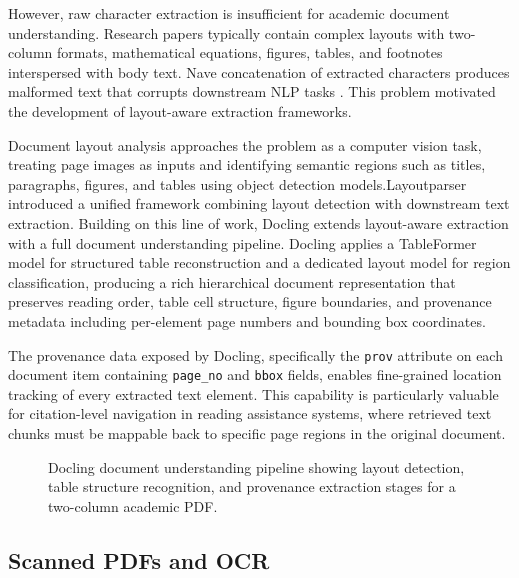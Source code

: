 \documentclass[12pt,a4paper]{report}
\begin{document}
However, raw character extraction is insufficient for academic 
document understanding. Research papers typically contain complex 
layouts with two-column formats, mathematical equations, figures, 
tables, and footnotes interspersed with body text. Nave 
concatenation of extracted characters produces malformed text 
that corrupts downstream NLP tasks \cite{vila2021}. This problem 
motivated the development of layout-aware extraction frameworks.

Document layout analysis approaches the problem as a computer 
vision task, treating page images as inputs and identifying 
semantic regions such as titles, paragraphs, figures, and tables 
using object detection models.Layoutparser \cite{shen2021} 
introduced a unified framework combining layout detection with 
downstream text extraction. Building on this line of work, 
Docling \cite{docling2024} extends layout-aware extraction with 
a full document understanding pipeline. Docling applies a 
TableFormer model \cite{nassar2022} for structured table 
reconstruction and a dedicated layout model for region 
classification, producing a rich hierarchical document 
representation that preserves reading order, table cell 
structure, figure boundaries, and provenance metadata including 
per-element page numbers and bounding box coordinates.

The provenance data exposed by Docling, specifically the 
\texttt{prov} attribute on each document item containing 
\texttt{page\_no} and \texttt{bbox} fields, enables fine-grained 
location tracking of every extracted text element. This 
capability is particularly valuable for citation-level navigation 
in reading assistance systems, where retrieved text chunks must 
be mappable back to specific page regions in the original document.

\begin{figure}[h]
    \centering
    \caption{Docling document understanding pipeline showing layout 
    detection, table structure recognition, and provenance extraction 
    stages for a two-column academic PDF.}
    \label{fig:docling_pipeline}
\end{figure}

\subsection{Scanned PDFs and OCR}
\end{document}
